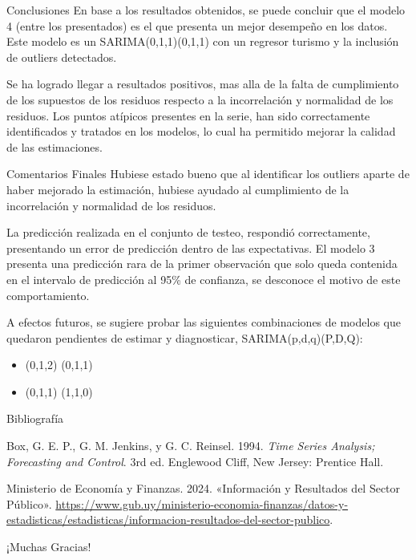 \documentclass[
  ignorenonframetext,
]{beamer}
\newlength{\cslhangindent}
\newlength{\cslentryspacingunit} %
\newenvironment{CSLReferences}[2] %
 {%
  \setlength{\parindent}{0pt}
  \ifodd #1
  \let\oldpar\par
  \def\par{\hangindent=\cslhangindent\oldpar}
  \fi
  \setlength{\parskip}{#2\cslentryspacingunit}
 }%
 {}
\begin{document}
\begin{frame}{Conclusiones}
\protect\hypertarget{conclusiones}{}
En base a los resultados obtenidos, se puede concluir que el modelo 4
(entre los presentados) es el que presenta un mejor desempeño en los
datos. Este modelo es un SARIMA(0,1,1)(0,1,1) con un regresor turismo y
la inclusión de outliers detectados.

Se ha logrado llegar a resultados positivos, mas alla de la falta de
cumplimiento de los supuestos de los residuos respecto a la
incorrelación y normalidad de los residuos. Los puntos atípicos
presentes en la serie, han sido correctamente identificados y tratados
en los modelos, lo cual ha permitido mejorar la calidad de las
estimaciones.
\end{frame}

\begin{frame}{Comentarios Finales}
\protect\hypertarget{comentarios}{}
Hubiese estado bueno que al identificar los outliers aparte de haber
mejorado la estimación, hubiese ayudado al cumplimiento de la
incorrelación y normalidad de los residuos.

La predicción realizada en el conjunto de testeo, respondió
correctamente, presentando un error de predicción dentro de las
expectativas. El modelo 3 presenta una predicción rara de la primer
observación que solo queda contenida en el intervalo de predicción al
95\% de confianza, se desconoce el motivo de este comportamiento.

A efectos futuros, se sugiere probar las siguientes combinaciones de
modelos que quedaron pendientes de estimar y diagnosticar,
SARIMA(p,d,q)(P,D,Q):

\begin{itemize}
\item
  (0,1,2) (0,1,1)
\item
  (0,1,1) (1,1,0)
\end{itemize}
\end{frame}

\begin{frame}{Bibliografía}
\protect\hypertarget{bibliografuxeda}{}
\hypertarget{refs}{}
\begin{CSLReferences}{1}{0}
\leavevmode{}%
Box, G. E. P., G. M. Jenkins, y G. C. Reinsel. 1994. \emph{Time Series
Analysis; Forecasting and Control}. 3rd ed. Englewood Cliff, New Jersey:
Prentice Hall.

\leavevmode{}%
Ministerio de Economía y Finanzas. 2024. {«{Información y Resultados del
Sector Público}»}.
\url{https://www.gub.uy/ministerio-economia-finanzas/datos-y-estadisticas/estadisticas/informacion-resultados-del-sector-publico}.

\end{CSLReferences}
\end{frame}

\begin{frame}{}
\protect\hypertarget{section}{}
\centering

¡Muchas Gracias!
\end{frame}
\end{document}
